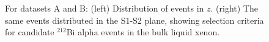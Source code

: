 \begin{figure}
\caption{For datasets A and B: (left) Distribution of events in $z$. (right)  The same events distributed in the S1-S2 plane, showing selection criteria for candidate $^{212}$Bi alpha events in the bulk liquid xenon.} 
\label{fig:all_plots_AB}
\end{figure}

